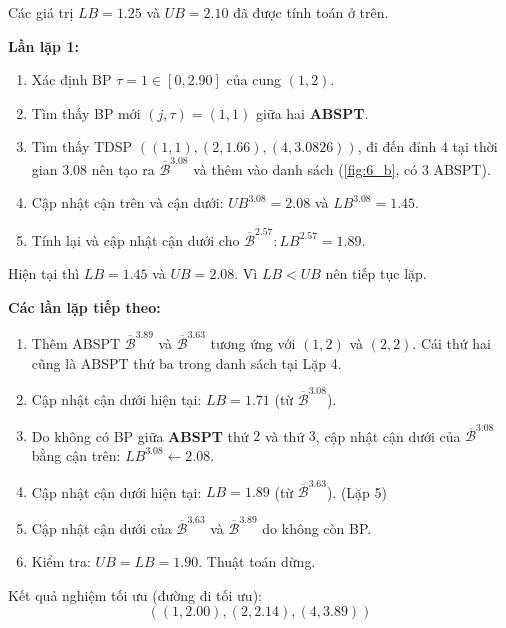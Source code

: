 \documentclass[../main.tex]{subfiles}
\begin{document}
Các giá trị \(LB=1.25\) và \(UB=2.10\) đã được tính toán ở trên.

\textbf{Lần lặp 1:}

\begin{enumerate}
\def\labelenumi{\arabic{enumi}.}
\tightlist
\item
  Xác định BP \(\tau = 1 \in [0, 2.90]\) của cung \((1, 2)\).
\item
  Tìm thấy BP mới \((j, \tau) = (1, 1)\) giữa hai \textbf{ABSPT}.
\item
  Tìm thấy TDSP \(((1, 1), (2, 1.66), (4, 3.0826))\), đi đến đỉnh \(4\)
  tại thời gian \(3.08\) nên tạo ra \(\overline{\mathcal B}^{3.08}\) và thêm
  vào danh sách (\autoref{fig:6_b}, có 3 ABSPT).
\item
  Cập nhật cận trên và cận dưới: \(UB^{3.08} = 2.08\) và
  \(LB^{3.08} = 1.45\).
\item
  Tính lại và cập nhật cận dưới cho
  \(\overline{\mathcal B}^{2.57} : LB^{2.57} = 1.89.\)
\end{enumerate}

Hiện tại thì \(LB=1.45\) và \(UB = 2.08\). Vì \(LB<UB\) nên tiếp tục
lặp.

\textbf{Các lần lặp tiếp theo:}

\begin{enumerate}
\def\labelenumi{\arabic{enumi}.}
\tightlist
\item
  Thêm ABSPT \(\overline{\mathcal B}^{3.89}\) và
  \(\overline{\mathcal B}^{3.63}\) tương ứng với \((1, 2)\) và \((2, 2)\).
  Cái thứ hai cũng là ABSPT thứ ba trong danh sách tại Lặp 4.
\item
  Cập nhật cận dưới hiện tại: \(LB = 1.71\) (từ
  \(\overline{\mathcal B}^{3.08}\)).
\item
  Do không có BP giữa \textbf{ABSPT} thứ \(2\) và thứ \(3\), cập
  nhật cận dưới của \(\overline{\mathcal B}^{3.08}\) bằng cận trên:
  \(LB^{3.08} \gets 2.08\).
\item
  Cập nhật cận dưới hiện tại: \(LB = 1.89\) (từ
  \(\overline{\mathcal B}^{3.63}\)). (Lặp 5)
\item
  Cập nhật cận dưới của \(\overline{\mathcal B}^{3.63}\) và
  \(\overline{\mathcal B}^{3.89}\) do không còn BP.
\item
  Kiểm tra: \(UB = LB = 1.90\). Thuật toán dừng.
\end{enumerate}

Kết quả nghiệm tối ưu (đường đi tối ưu):
\[((1, 2.00), (2, 2.14), (4, 3.89))\]
\backmatter
\end{document}
